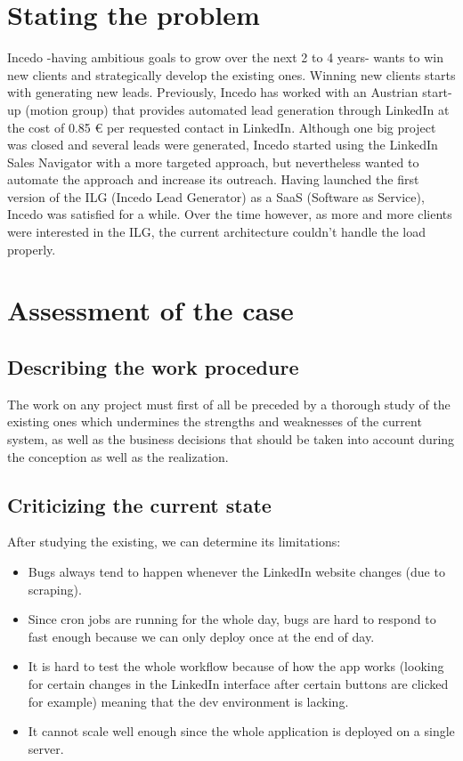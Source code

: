 \section{Stating the problem}
Incedo -having ambitious goals to grow over the next 2 to 4 years- wants to win new clients and strategically develop the existing ones. Winning new clients starts with generating new leads. Previously, Incedo has worked with an Austrian start-up (motion group) that provides automated lead generation through LinkedIn at the cost of 0.85 € per requested contact in LinkedIn. Although one big project was closed and several leads were generated, Incedo started using the LinkedIn Sales Navigator with a more targeted approach, but nevertheless wanted to automate the approach and increase its outreach.
Having launched the first version of the ILG (Incedo Lead Generator) as a SaaS (Software as Service), Incedo was satisfied for a while. Over the time however, as more and more clients were interested in the ILG, the current architecture couldn’t handle the load properly.

\section{Assessment of the case}
\subsection{Describing the work procedure}
The work on any project must first of all be preceded by a thorough study of the existing ones which undermines the strengths and weaknesses of the current system, as well as the business decisions that should be taken into account during the conception as well as the realization.
\subsection{Criticizing the current state}
After studying the existing, we can determine its limitations:
\begin{itemize}
	\item Bugs always tend to happen whenever the LinkedIn website changes (due to scraping).
	\item Since cron jobs are running for the whole day, bugs are hard to respond to fast enough because we can only deploy once at the end of day.
	\item It is hard to test the whole workflow because of how the app works (looking for certain changes in the LinkedIn interface after certain buttons are clicked for example) meaning that the dev environment is lacking.
	\item It cannot scale well enough since the whole application is deployed on a single server.
\end{itemize}
